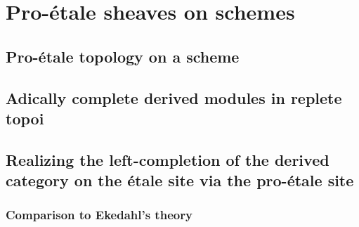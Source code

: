 







\section{Pro-\'etale sheaves on schemes}

\subsection{Pro-\'etale topology on a scheme}





\subsection{Adically complete derived modules in replete topoi}



\subsection{Realizing the left-completion of the derived category on the \'etale site via the pro-\'etale site}




\subsubsection{Comparison to Ekedahl's theory}






